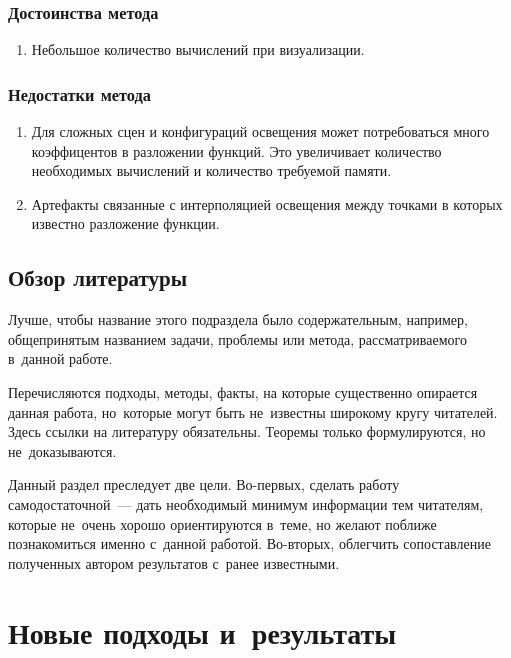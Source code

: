 \documentclass[12pt,fleqn]{article}
\begin{document}
\subsubsection{Достоинства метода}

\begin{enumerate}

\item Небольшое количество вычислений при визуализации.

\end{enumerate}

\subsubsection{Недостатки метода}

\begin{enumerate}

\item Для сложных сцен и конфигураций освещения может потребоваться много коэффицентов в разложении функций. Это увеличивает количество необходимых вычислений и количество требуемой памяти.

\item Артефакты связанные с интерполяцией освещения между точками в которых известно разложение функции.

\end{enumerate}

\subsection{Обзор литературы}

Лучше, чтобы название этого подраздела было содержательным, 
например, общепринятым названием задачи, проблемы или метода,
рассматриваемого в~данной работе. 

Перечисляются подходы, методы, факты, на которые существенно опирается данная работа, 
но~которые могут быть не~известны широкому кругу читателей.
Здесь ссылки на литературу обязательны. 
Теоремы только формулируются, но не~доказываются.

Данный раздел преследует две цели. 
Во-первых, сделать работу самодостаточной~--- дать необходимый минимум информации тем читателям,
которые не~очень хорошо ориентируются в~теме, но желают поближе познакомиться именно с~данной работой.
Во-вторых, облегчить сопоставление полученных автором результатов с~ранее известными.

\section{Новые подходы и~результаты}
\end{document}
